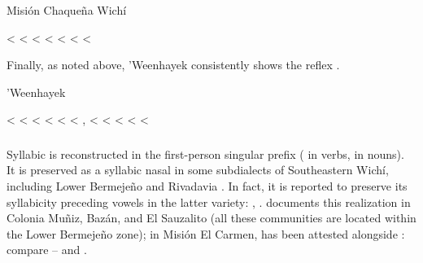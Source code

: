 \newpage
\ea
Misión Chaqueña Wichí \citep{MG-MELO15} \label{wi-mgmelo-xx}\\
    \begin{xlist}
        \ex {} < 
        \ex {} < 
        \ex {} < 
        \ex {} < 
        \ex {} <  
        \ex {} <  \label{wi-mgmelo-xx-fox}
        \ex {} <  \label{wi-mgmelo-xx-thing}
    \end{xlist}
\z
 
Finally, as noted above, ’Weenhayek consistently shows the reflex  .

\ea
’Weenhayek \citep{KC16} \label{wi-whk-xx}\\
    \begin{xlist}
        \ex {} < 
        \ex {} < 
        \ex {} < 
        \ex {} < 
        \ex {} < 
        \ex {} < 
        \ex {},  < 
        \ex {} < 
        \ex {} < 
        \ex {} < 
        \ex {} < 
    \end{xlist}
\z
{}

\subsubsection{}

Syllabic  is reconstructed in the first-person singular prefix ( in verbs,  in nouns). It is preserved as a syllabic nasal in some subdialects of Southeastern Wichí, including Lower Bermejeño \citep[52, 98, 163, 223]{VN14} and Rivadavia \citep[41–42]{JT09-th}. In fact, it is reported to preserve its syllabicity preceding vowels in the latter variety: , . \citet[132, 134, 137–138]{MC09} documents this realization in Colonia Muñiz, Bazán, and El Sauzalito (all these communities are located within the Lower Bermejeño zone); in Misión El Carmen,  has been attested alongside : compare – and .

